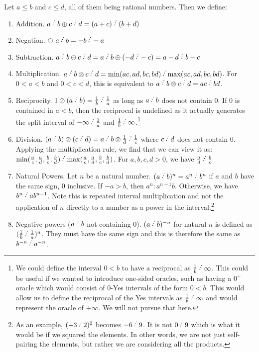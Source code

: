\documentclass[12pt]{article}
\begin{document}
Let $a \leq b$ and $c \leq d$, all of them being rational numbers. Then we define:
\begin{enumerate}
    \item Addition. $a\lte b \oplus c\lte d = (a+c)\lte (b+d)$
    \item Negation. $\ominus\ a\lte b = -b\lte -a$
    \item Subtraction. $a\lte b \ominus c\lte d = a\lte b \oplus (-d\lte -c) = a-d\lte b-c$
    \item Multiplication. $a\lte b \otimes c\lte d = \min(ac, ad, bc, bd)\lte  \max(ac,ad,bc,bd)$. For $0<a<b$ and $0<c<d$, this is equivalent to $a\lte b \otimes c\lte d = ac\lte bd$. 
    \item Reciprocity. $1 \oslash (a\lte b) = \frac{1}{b}\lte \frac{1}{a}$ as long as $a\lte b$ does not contain 0. If 0 is contained in $a \lt b$, then the reciprocal is undefined as it actually generates the split interval of $-\infty\lte \frac{1}{a}$ and $\frac{1}{b}\lte \infty$.\footnote{We could define the interval $0 \lt b$ to have a reciprocal as $\frac{1}{b}\lte \infty$. This could be useful if we wanted to introduce one-sided oracles, such as having a $0^+$ oracle which would consist of $0$-Yes intervals of the form $0\lt b$. This would allow us to define the reciprocal of the Yes intervals as $\frac{1}{b}\lte \infty$ and would represent the oracle of $+ \infty$. We will not pursue that here.  }
    \item Division. $(a\lte b) \oslash (c\lte d) = a\lte b \otimes \frac{1}{d}\lte \frac{1}{c}$ where $c\lte d$ does not contain 0. Applying the multiplication rule, we find that we can view it as:   $\min(\frac{a}{c}, \frac{a}{d}, \frac{b}{c}, \frac{b}{d})\lte  \max(\frac{a}{c},\frac{a}{d},\frac{b}{c},\frac{b}{d})$. For $a, b, c, d > 0$, we have $\frac{a}{d} \lte  \frac{b}{c}$
    \item Natural Powers. Let $n$ be a natural number. $(a\lte b)^n = a^n\lte b^n$ if $a$ and $b$ have the same sign, 0 inclusive. If $-a > b$, then $a^n : a^{n-1} b$. Otherwise, we have $b^n \lte a b^{n-1}$. Note this is repeated interval multiplication and not the application of $n$ directly to a number as a power in the interval.\footnote{ As an example, $(-3 \lte 2)^2$ becomes $-6\lte 9$. It is not $0\lte 9$ which is what it would be if we squared the elements. In other words, we are not just self-pairing the elements, but rather we are considering all the products. } 
    \item Negative powers ($a\lte b$ not containing 0). $(a\lte b)^{-n}$ for natural $n$ is defined as $(\frac{1}{b}\lte \frac{1}{a})^n$. They must have the same sign and this is therefore the same as $b^{-n} \lte  a^{-n}$.
\end{enumerate}
\end{document}
